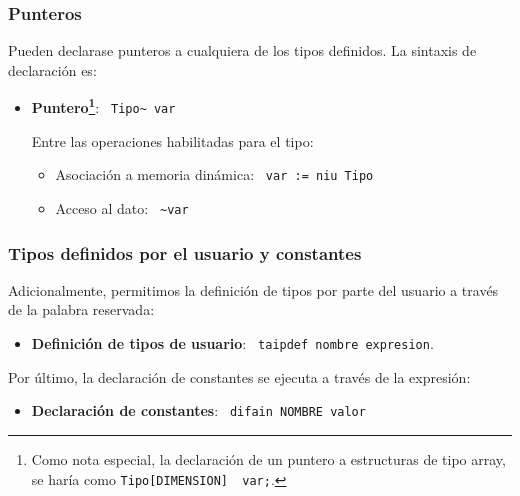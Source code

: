 \documentclass[10pt,a4paper]{article}
\begin{document}
\subsubsection{Punteros}
Pueden declarase punteros a cualquiera de los tipos definidos. La sintaxis de declaración es:
\begin{itemize}
    \item \textbf{Puntero\footnote{Como nota especial, la declaración de un puntero a estructuras de tipo array, se haría como \texttt{Tipo[DIMENSION]~ var;}.}}: \texttt{\color{blue} Tipo\~{} var}
    
    Entre las operaciones habilitadas para el tipo:
    \begin{itemize}
        \item Asociación a memoria dinámica: \texttt{\color{blue} var := niu Tipo}
        \item Acceso al dato: \texttt{\color{blue} \~{}var}
    \end{itemize}
\end{itemize}

\subsubsection{Tipos definidos por el usuario y constantes}
Adicionalmente, permitimos la definición de tipos por parte del usuario a través de la palabra reservada:
\begin{itemize}
    \item \textbf{Definición de tipos de usuario}: \texttt{\color{blue} taipdef nombre expresion}.
\end{itemize}
Por último, la declaración de constantes se ejecuta a través de la expresión:
\begin{itemize}
    \item \textbf{Declaración de constantes}: \texttt{\color{blue} difain NOMBRE valor}
\end{itemize}
\end{document}
